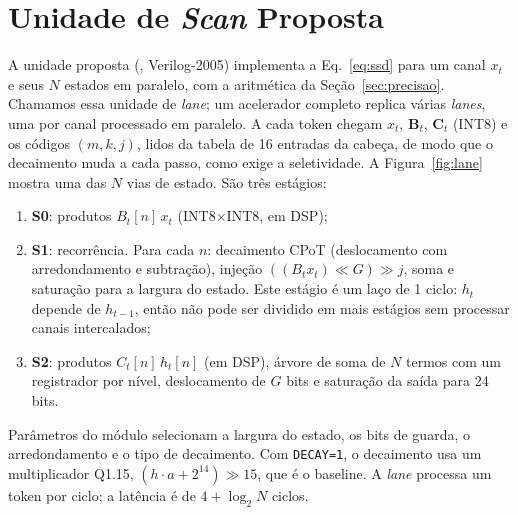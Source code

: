 \documentclass[12pt]{article}
\begin{document}
\section{Unidade de \emph{Scan} Proposta}
\label{sec:arq}

A unidade proposta (, Verilog-2005) implementa a Eq.~\ref{eq:ssd} para um canal $x_t$ e seus $N$ estados em paralelo, com a aritmética da Seção~\ref{sec:precisao}. Chamamos essa unidade de \emph{lane}; um acelerador completo replica várias \emph{lanes}, uma por canal processado em paralelo. A cada token chegam $x_t$, $\mathbf{B}_t$, $\mathbf{C}_t$ (INT8) e os códigos $(m, k, j)$, lidos da tabela de 16 entradas da cabeça, de modo que o decaimento muda a cada passo, como exige a seletividade. A Figura~\ref{fig:lane} mostra uma das $N$ vias de estado. São três estágios:
\begin{enumerate}
  \item \textbf{S0}: produtos $B_t[n]\,x_t$ (INT8$\times$INT8, em DSP);
  \item \textbf{S1}: recorrência. Para cada $n$: decaimento CPoT (deslocamento com arredondamento e subtração), injeção $((B_t x_t) \ll G) \gg j$, soma e saturação para a largura do estado. Este estágio é um laço de 1 ciclo: $h_t$ depende de $h_{t-1}$, então não pode ser dividido em mais estágios sem processar canais intercalados;
  \item \textbf{S2}: produtos $C_t[n]\,h_t[n]$ (em DSP), árvore de soma de $N$ termos com um registrador por nível, deslocamento de $G$ bits e saturação da saída para 24 bits.
\end{enumerate}
Parâmetros do módulo selecionam a largura do estado, os bits de guarda, o arredondamento e o tipo de decaimento. Com \texttt{DECAY=1}, o decaimento usa um multiplicador Q1.15, $(h \cdot a + 2^{14}) \gg 15$, que é o baseline. A \emph{lane} processa um token por ciclo; a latência é de $4 + \log_2 N$ ciclos.
\end{document}
